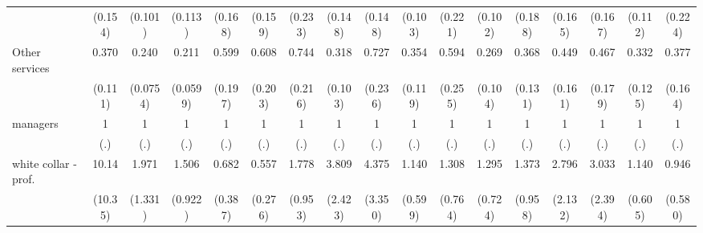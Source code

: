 {\begin{tabular}{l*{16}{c}}
                    &     (0.154)         &     (0.101)         &     (0.113)         &     (0.168)         &     (0.159)         &     (0.233)         &     (0.148)         &     (0.148)         &     (0.103)         &     (0.221)         &     (0.102)         &     (0.188)         &     (0.165)         &     (0.167)         &     (0.112)         &     (0.224)         \\
[1em]
Other services      &       0.370\sym{***}&       0.240\sym{***}&       0.211\sym{***}&       0.599         &       0.608         &       0.744         &       0.318\sym{***}&       0.727         &       0.354\sym{**} &       0.594         &       0.269\sym{***}&       0.368\sym{**} &       0.449\sym{*}  &       0.467\sym{*}  &       0.332\sym{**} &       0.377\sym{*}  \\
                    &     (0.111)         &    (0.0754)         &    (0.0599)         &     (0.197)         &     (0.203)         &     (0.216)         &     (0.103)         &     (0.236)         &     (0.119)         &     (0.255)         &     (0.104)         &     (0.131)         &     (0.161)         &     (0.179)         &     (0.125)         &     (0.164)         \\
[1em]
managers            &           1         &           1         &           1         &           1         &           1         &           1         &           1         &           1         &           1         &           1         &           1         &           1         &           1         &           1         &           1         &           1         \\
                    &         (.)         &         (.)         &         (.)         &         (.)         &         (.)         &         (.)         &         (.)         &         (.)         &         (.)         &         (.)         &         (.)         &         (.)         &         (.)         &         (.)         &         (.)         &         (.)         \\
[1em]
white collar - prof.&       10.14\sym{*}  &       1.971         &       1.506         &       0.682         &       0.557         &       1.778         &       3.809\sym{*}  &       4.375         &       1.140         &       1.308         &       1.295         &       1.373         &       2.796         &       3.033         &       1.140         &       0.946         \\
                    &     (10.35)         &     (1.331)         &     (0.922)         &     (0.387)         &     (0.276)         &     (0.953)         &     (2.423)         &     (3.350)         &     (0.599)         &     (0.764)         &     (0.724)         &     (0.958)         &     (2.132)         &     (2.394)         &     (0.605)         &     (0.580)         \\

\end{tabular}}
